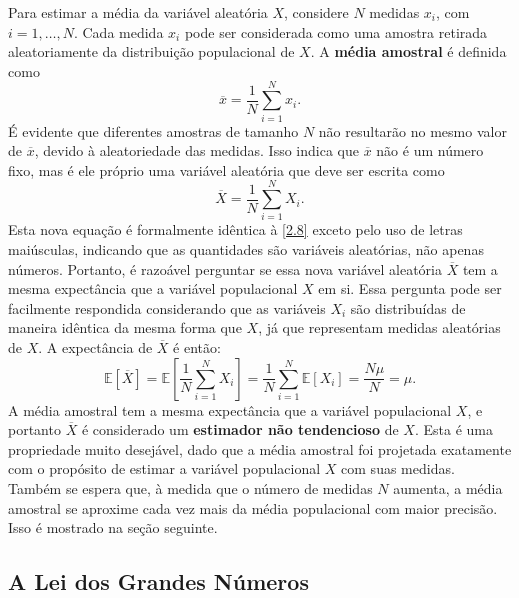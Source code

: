 Para estimar a média da variável aleatória $X$, considere $N$ medidas $x_i$, com $i = 1, \ldots, N$. Cada medida $x_i$ pode ser considerada como uma amostra retirada aleatoriamente da distribuição populacional de $X$. A \textbf{média amostral} é definida como
\begin{equation}\label{2.8}
\overline{x} = \dfrac{1}{N} \sum_{i=1}^{N} x_i.
\end{equation}
É evidente que diferentes amostras de tamanho $N$ não resultarão no mesmo valor de $\overline{x}$, devido à aleatoriedade das medidas. Isso indica que $\overline{x}$ não é um número fixo, mas é ele próprio uma variável aleatória que deve ser escrita como
\begin{equation*}
	\overline{X} = \dfrac{1}{N} \sum_{i=1}^{N} X_i.
\end{equation*}
Esta nova equação é formalmente idêntica à \eqref{2.8} exceto pelo uso de letras maiúsculas, indicando que as quantidades são variáveis aleatórias, não apenas números. Portanto, é razoável perguntar se essa nova variável aleatória $\overline{X}$ tem a mesma expectância que a variável populacional $X$ em si. Essa pergunta pode ser facilmente respondida considerando que as variáveis $X_i$ são distribuídas de maneira idêntica da mesma forma que $X$, já que representam medidas aleatórias de $X$. A expectância de $\overline{X}$ é então:
\begin{equation*}
\mathbb{E}[\overline{X}] = \mathbb{E}\left[\dfrac{1}{N} \sum_{i=1}^{N} X_i\right] = \dfrac{1}{N}\sum_{i=1}^{N}\mathbb{E}[X_i] = \dfrac{N\mu}{N} = \mu.
\end{equation*}
A média amostral tem a mesma expectância que a variável populacional $X$, e portanto $\overline{X}$ é considerado um \textbf{estimador não tendencioso} de $X$. Esta é uma propriedade muito desejável, dado que a média amostral foi projetada exatamente com o propósito de estimar a variável populacional $X$ com suas medidas. Também se espera que, à medida que o número de medidas $N$ aumenta, a média amostral se aproxime cada vez mais da média populacional com maior precisão. Isso é mostrado na seção seguinte.

\subsection{A Lei dos Grandes Números}

